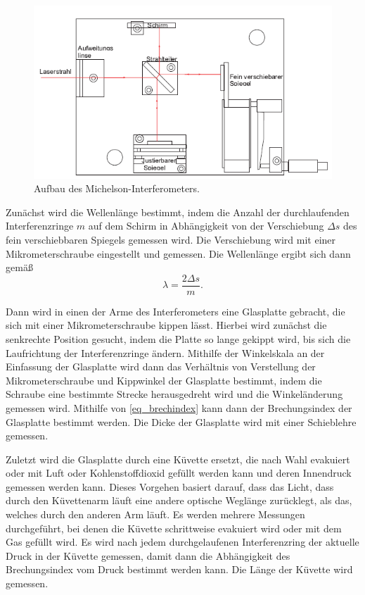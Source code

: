 \documentclass[
	a4paper,
	12pt,
	pagesize,
	ngerman
]{scrartcl}
\begin{document}
	\begin{figure}[H]
		\includegraphics[width=\textwidth]{images/michelson_aufbau}
		\centering
		\caption{Aufbau des Michelson-Interferometers. \cite{Anleitung}}
		\label{fig_aufbau}
	\end{figure}

	Zunächst wird die Wellenlänge bestimmt, indem die Anzahl der durchlaufenden Interferenzringe $m$ auf dem Schirm in Abhängigkeit von der Verschiebung $\Delta s$ des fein verschiebbaren Spiegels gemessen wird. %
	Die Verschiebung wird mit einer Mikrometerschraube eingestellt und gemessen.
	Die Wellenlänge ergibt sich dann gemäß
	\begin{equation}
		\lambda = \frac{2 \Delta s}{m}. %
		\label{eq_wellenlaenge}
	\end{equation}

	Dann wird in einen der Arme des Interferometers eine Glasplatte gebracht, die sich mit einer Mikrometerschraube kippen lässt. %
	Hierbei wird zunächst die senkrechte Position gesucht, indem die Platte so lange gekippt wird, bis sich die Laufrichtung der Interferenzringe ändern.
	Mithilfe der Winkelskala an der Einfassung der Glasplatte wird dann das Verhältnis von Verstellung der Mikrometerschraube und Kippwinkel der Glasplatte bestimmt, indem die Schraube eine bestimmte Strecke herausgedreht wird und die Winkeländerung gemessen wird.
	Mithilfe von \cref{eq_brechindex} kann dann der Brechungsindex der Glasplatte bestimmt werden.
	Die Dicke der Glasplatte wird mit einer Schieblehre gemessen.

	Zuletzt wird die Glasplatte durch eine Küvette ersetzt, die nach Wahl evakuiert oder mit Luft oder Kohlenstoffdioxid gefüllt werden kann und deren Innendruck gemessen werden kann.
	Dieses Vorgehen basiert darauf, dass das Licht, dass durch den Küvettenarm läuft eine andere optische Weglänge zurücklegt, als das, welches durch den anderen Arm läuft.
	Es werden mehrere Messungen durchgeführt, bei denen die Küvette schrittweise evakuiert wird oder mit dem Gas gefüllt wird.
	Es wird nach jedem durchgelaufenen Interferenzring der aktuelle Druck in der Küvette gemessen, damit dann die Abhängigkeit des Brechungsindex vom Druck bestimmt werden kann.
	Die Länge der Küvette wird gemessen.
\end{document}
